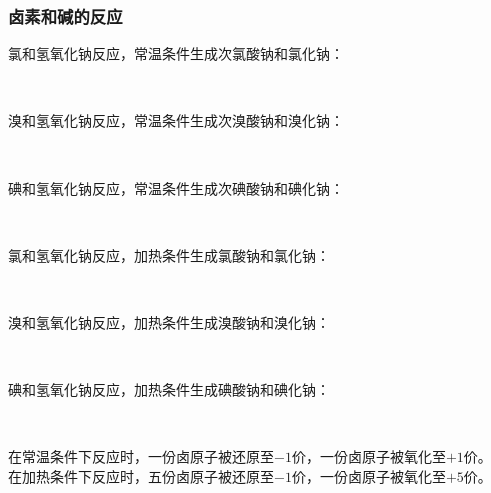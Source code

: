 \documentclass[UTF8]{ctexart}
\begin{document}
\newpage

\subsubsection{卤素和碱的反应}
    氯和氢氧化钠反应，常温条件生成次氯酸钠和氯化钠：
    \begin{center}
        \\[6mm]
    \end{center}
    溴和氢氧化钠反应，常温条件生成次溴酸钠和溴化钠：
    \begin{center}
        \\[6mm]
    \end{center}
    碘和氢氧化钠反应，常温条件生成次碘酸钠和碘化钠：
    \begin{center}
        \\[6mm]
    \end{center}
    氯和氢氧化钠反应，加热条件生成氯酸钠和氯化钠：
    \begin{center}
        \\[6mm]
    \end{center}
    溴和氢氧化钠反应，加热条件生成溴酸钠和溴化钠：
    \begin{center}
        \\[6mm]
    \end{center}
    碘和氢氧化钠反应，加热条件生成碘酸钠和碘化钠：
    \begin{center}
        \\[6mm]
    \end{center}
    在常温条件下反应时，一份卤原子被还原至$-1$价，一份卤原子被氧化至$+1$价。\\[3mm]
    在加热条件下反应时，五份卤原子被还原至$-1$价，一份卤原子被氧化至$+5$价。

\newpage
\end{document}
